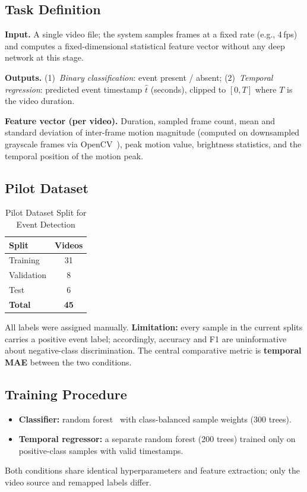 \documentclass[10pt,conference]{IEEEtran}
\begin{document}
\subsection{Task Definition}

\textbf{Input.} A single video file; the system samples frames at a fixed
rate (e.g., 4\,fps) and computes a fixed-dimensional statistical feature
vector without any deep network at this stage.

\textbf{Outputs.} (1)~\emph{Binary classification}: event present / absent;
(2)~\emph{Temporal regression}: predicted event timestamp $\hat{t}$
(seconds), clipped to $[0, T]$ where $T$ is the video duration.

\textbf{Feature vector (per video).} Duration, sampled frame count, mean and
standard deviation of inter-frame motion magnitude (computed on
downsampled grayscale frames via OpenCV~\cite{bradski2000}), peak motion
value, brightness statistics, and the temporal position of the motion peak.

\subsection{Pilot Dataset}

\begin{table}[H]
\centering
\caption{Pilot Dataset Split for Event Detection}
\label{tab:event_split}
\begin{tabular}{lc}
\toprule
\textbf{Split} & \textbf{Videos} \\
\midrule
Training   & 31 \\
Validation & 8  \\
Test       & 6  \\
\midrule
\textbf{Total} & \textbf{45} \\
\bottomrule
\end{tabular}
\end{table}

All labels were assigned manually. \textbf{Limitation:} every sample in the
current splits carries a positive event label; accordingly, accuracy and F1
are uninformative about negative-class discrimination. The central comparative
metric is \textbf{temporal MAE} between the two conditions.

\subsection{Training Procedure}

\begin{itemize}
  \item \textbf{Classifier:} random forest~\cite{breiman2001} with
        class-balanced sample weights (300 trees).
  \item \textbf{Temporal regressor:} a separate random forest (200 trees)
        trained only on positive-class samples with valid timestamps.
\end{itemize}
Both conditions share identical hyperparameters and feature extraction;
only the video source and remapped labels differ.
\end{document}
